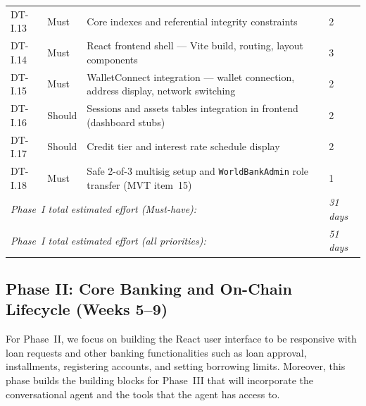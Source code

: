 \documentclass[12pt,a4paper]{report}
\begin{document}
\begin{table}[H]
\begin{tabular}{p{1.8cm}p{1.8cm}p{7.5cm}p{1.5cm}}
DT-I.13 & Must & Core indexes and referential integrity constraints & 2 \\
DT-I.14 & Must & React frontend shell --- Vite build, routing, layout components & 3 \\
DT-I.15 & Must & WalletConnect integration --- wallet connection, address display, network switching & 2 \\
DT-I.16 & Should & Sessions and assets tables integration in frontend (dashboard stubs) & 2 \\
DT-I.17 & Should & Credit tier and interest rate schedule display & 2 \\
DT-I.18 & Must & Safe 2-of-3 multisig setup and \texttt{WorldBankAdmin} role transfer (MVT item~15) & 1 \\
\multicolumn{3}{l}{\textit{Phase~I total estimated effort (Must-have):}} & \textit{31 days} \\
\multicolumn{3}{l}{\textit{Phase~I total estimated effort (all priorities):}} & \textit{51 days} \\
\bottomrule
\end{tabular}
\end{table}


\subsection{Phase II: Core Banking and On-Chain Lifecycle (Weeks 5--9)}

For Phase~II, we focus on building the React user interface to be responsive with loan requests and other banking functionalities such as loan approval, installments, registering accounts, and setting borrowing limits. Moreover, this phase builds the building blocks for Phase~III that will incorporate the conversational agent and the tools that the agent has access to.
\end{document}
